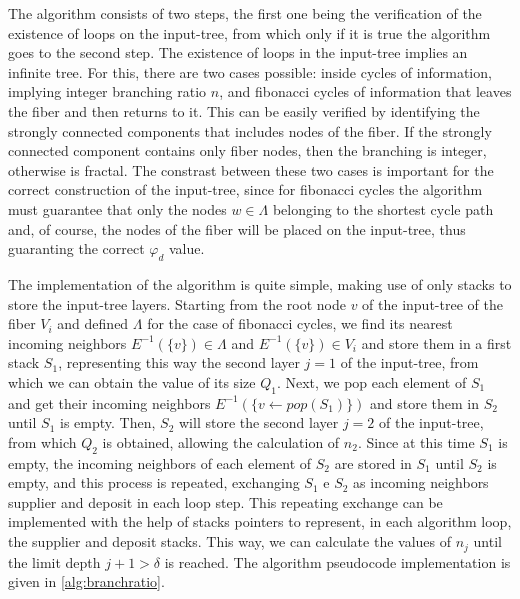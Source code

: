 \documentclass[12pt]{diazessay} %
\begin{document}
The algorithm consists of two steps, the first one being the verification of the existence of loops on the input-tree, from which only if it is true the algorithm goes to the second step. The existence of loops in the input-tree implies an infinite tree. For this, there are two cases possible: inside cycles of information, implying integer branching ratio $n$, and fibonacci cycles of information that leaves the fiber and then returns to it. This can be easily verified by identifying the strongly connected components that includes nodes of the fiber. If the strongly connected component contains only fiber nodes, then the branching is integer, otherwise is fractal. The constrast between these two cases is important for the correct construction of the input-tree, since for fibonacci cycles the algorithm must guarantee that only the nodes $w \in \Lambda$ belonging to the shortest cycle path and, of course, the nodes of the fiber will be placed on the input-tree, thus guaranting the correct $\varphi_d$ value.

The implementation of the algorithm is quite simple, making use of only stacks to store the input-tree layers. Starting from the root node $v$ of the input-tree of the fiber $V_i$ and defined $\Lambda$ for the case of fibonacci cycles, we find its nearest incoming neighbors $E^{-1}(\{v\}) \in \Lambda$ and $E^{-1}(\{v\}) \in V_i$ and store them in a first stack $S_1$, representing this way the second layer $j = 1$ of the input-tree, from which we can obtain the value of its size $Q_1$. Next, we pop each element of $S_1$ and get their incoming neighbors $E^{-1}(\{v \leftarrow pop(S_1)\})$ and store them in $S_2$ until $S_1$ is empty. Then, $S_2$ will store the second layer $j = 2$ of the input-tree, from which $Q_2$ is obtained, allowing the calculation of $n_2$. Since at this time $S_1$ is empty, the incoming neighbors of each element of $S_2$ are stored in $S_1$ until $S_2$ is empty, and this process is repeated, exchanging $S_1$ e $S_2$ as incoming neighbors supplier and deposit in each loop step. This repeating exchange can be implemented with the help of stacks pointers to represent, in each algorithm loop, the supplier and deposit stacks. This way, we can calculate the values of $n_j$ until the limit depth $j+1 > \delta$ is reached. The algorithm pseudocode implementation is given in \ref{alg:branchratio}.
\end{document}
